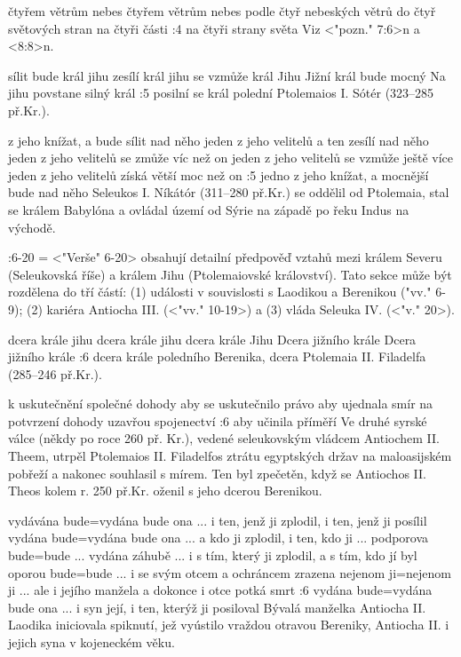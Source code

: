     {čtyřem větrům nebes}   %
    {čtyřem větrům nebes}   %
    {podle čtyř nebeských větrů}   %
    {do čtyř světových stran}   %
    {na čtyři části}   %
:4 {na čtyři strany světa}  Viz <"pozn." 7:6>n a <8:8>n. 

    {sílit bude král jihu}   %
    {zesílí král jihu}   %
    {se vzmůže král Jihu}   %
    {Jižní král bude mocný}   %
    {Na jihu povstane silný král}   %
:5 {posilní se král polední} Ptolemaios I. Sótér (323--285 př.Kr.).  
   
    {z jeho knížat, a bude sílit nad něho}   %
    {jeden z jeho velitelů a ten zesílí nad něho}   %
    {jeden z jeho velitelů se zmůže víc než on}   %
    {jeden z jeho velitelů se vzmůže ještě více}   %
    {jeden z jeho velitelů získá větší moc než on}   %
:5 {jedno z jeho knížat, a mocnější bude nad něho} 
    Seleukos I. Níkátór (311--280 př.Kr.) se oddělil od Ptolemaia, stal se králem Babylóna a ovládal území od Sýrie na západě po řeku Indus na východě.
   
:6-20 {}={}  <"Verše" 6-20> obsahují detailní předpověď vztahů mezi  králem Severu (Seleukovská říše) a králem Jihu (Ptolemaiovské království). Tato sekce může být rozdělena do tří částí: (1) události v souvislosti s Laodikou a Berenikou ("vv." 6-9); (2) kariéra Antiocha III. (<"vv." 10-19>) a (3) vláda Seleuka IV. (<"v." 20>).


    {dcera krále jihu}   %
    {dcera krále jihu}   %
    {dcera krále Jihu}   %
    {Dcera jižního krále}   %
    {Dcera jižního krále}   %
:6 {dcera krále poledního}
    Berenika, dcera Ptolemaia II. Filadelfa (285--246 př.Kr.). 


    {k uskutečnění společné dohody}   %
    {aby se uskutečnilo právo}   %
    {aby ujednala smír}   %
    {na potvrzení dohody}   %
    {uzavřou spojenectví}   %
:6 {aby učinila příměří}
    Ve druhé syrské válce (někdy po roce 260 př. Kr.), vedené seleukovským vládcem Antiochem II. Theem, utrpěl Ptolemaios II. Filadelfos ztrátu egyptských držav na maloasijském pobřeží a nakonec souhlasil s mírem. Ten byl zpečetěn, když se Antiochos II. Theos kolem r. 250 př.Kr. oženil s jeho dcerou Berenikou.

    {vydávána bude}={vydána bude ona ... i ten, jenž ji zplodil, i ten, jenž ji posílil}   %
    {vydána bude}={vydána bude ona ... a kdo ji zplodil, i ten, kdo ji ... podporova}   %
    {bude}={bude ... vydána záhubě ... i s tím, který ji zplodil, a s tím, kdo jí byl oporou}   %
    {bude}={bude ... i se svým otcem a ochráncem zrazena}   %
    {nejenom ji}={nejenom ji ... ale i jejího manžela a dokonce i otce potká smrt}   %
:6 {vydána bude}={vydána bude ona ... i syn její, i ten, kterýž ji posiloval} 
    Bývalá manželka Antiocha II. Laodika iniciovala spiknutí, jež vyústilo vraždou otravou Bereniky, Antiocha II. i jejich syna v kojeneckém věku.


